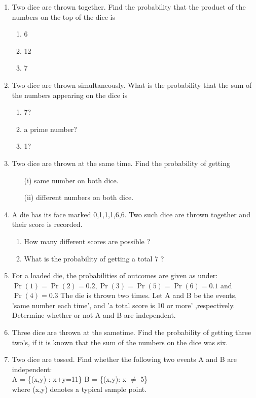\begin{enumerate}[label=\thesection.\arabic*,ref=\thesection.\theenumi]
	\item Two dice are thrown together. Find the probability that the product of the numbers
on the top of the dice is
\begin{enumerate}
\item 6
\item 12
\item 7
\end{enumerate}
		\solution
		
  \item Two dice are thrown simultaneously. What is the probability that the sum of the numbers appearing on the dice is 
\begin{enumerate}
\item{7?}
\item{a prime number?}
\item{1?}
\end{enumerate}
\solution

\item Two dice are thrown at the same time. Find the probability of getting
\begin{enumerate}
    \item[(i)] same number on both dice.
    \item[(ii)] different numbers on both dice.
\end{enumerate}

\item A die has its face marked 0,1,1,1,6,6. Two such dice are thrown together and their score is recorded.
\begin{enumerate}
	\item How many different scores are possible ?
	\item What is the probability of getting a total 7 ?  
\end{enumerate}

\item For a loaded die, the probabilities of outcomes are given as under:
$\Pr(1) = \Pr(2) = 0.2, \Pr(3) = \Pr(5) = \Pr(6) = 0.1$ and $\Pr(4) = 0.3$
The die is thrown two times. Let A and B be the events, 'same number each time', and
'a total score is 10 or more' ,respectively. Determine whether or not A and B are independent.

\item Three dice are thrown at the sametime. Find the probability of getting three
two’s, if it is known that the sum of the numbers on the dice was six.

\item Two dice are tossed. Find whether the following two events A and B are independent:\\
A = \{(x,y) : x+y=11\} B = \{(x,y): x $\neq$ 5\}\\
where (x,y) denotes a typical sample point.

\end{enumerate}
